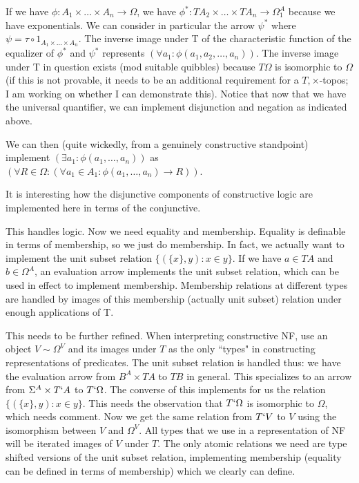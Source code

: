 \documentclass[12pt]{article}
\begin{document}
If we have $\phi:A_1\times \ldots \times A_n \rightarrow \Omega$, we have $\phi^*:TA_2 \times \ldots \times TA_n\rightarrow \Omega^A_1$ because we have exponentials.  We can consider in particular
the arrow $\psi^*$ where $\psi = \tau \circ 1_{A_1 \times \ldots \times A_n}$.   The inverse image under T of the characteristic function of the equalizer of $\phi^*$ and $\psi^*$ represents
$(\forall a_1:\phi(a_1,a_2,\ldots,a_n))$.  The inverse image under T in question exists (mod suitable quibbles) because $T\Omega$ is isomorphic to $\Omega$ (if this is not provable, it needs to be an additional requirement for a $T,\times$-topos; I am working on whether I can demonstrate this).  Notice that now that we have the universal quantifier, we can implement disjunction and negation as indicated above.

We can then (quite wickedly, from a genuinely constructive standpoint) implement $(\exists a_1:\phi(a_1,\ldots,a_n))$ as $(\forall R\in \Omega:(\forall a_1\in A_1:\phi(a_1,\ldots,a_n) \rightarrow R))$.

It is interesting how the disjunctive components of constructive logic are implemented here in terms of the conjunctive.

This handles logic.  Now we need equality and membership.  Equality is definable in terms of membership, so we just do membership.  In fact, we actually want to implement
the unit subset relation  $\{(\{x\},y):x \in y\}$.  If we have $a \in TA$ and $b \in \Omega^A$,  an evaluation arrow implements the unit subset relation, which can be used in effect to implement membership.
Membership relations at different types are handled by images of this membership (actually unit subset) relation under enough applications of T.

This needs to be further refined.  When interpreting constructive NF, use an object $V \sim \Omega^V$ and its images under $T$ as the only ``types" in constructing representations of predicates.  The unit subset relation is handled thus:  we have the evaluation arrow from $B^A \times TA$ to $TB$ in general.  This specializes to an arrow from
$\Sigma^A \times T`A$ to $T`\Omega$.  The converse of this implements for us the relation $\{(\{x\},y):x \in y\}$.  This needs the observation that $T`\Omega$ is isomorphic to $\Omega$, which needs comment.  Now we get the same relation from $T`V$ to $V$ using the isomorphism between $V$ and $\Omega^V$.  All types that we use in a representation of
NF will be iterated images of $V$ under $T$.  The only atomic relations we need are type shifted versions of the unit subset relation, implementing membership (equality can be defined in terms of membership) which we clearly can define.
\end{document}

